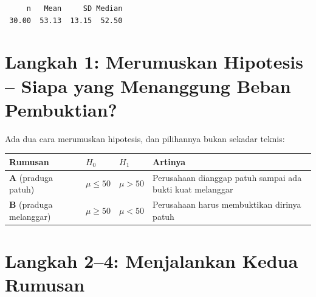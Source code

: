 \documentclass[
  indonesian,
  letterpaper,
]{book}
\newcounter{none} %
\begin{document}
\begin{verbatim}
     n   Mean     SD Median 
 30.00  53.13  13.15  52.50 
\end{verbatim}

\section{Langkah 1: Merumuskan Hipotesis -- Siapa yang Menanggung Beban
Pembuktian?}\label{langkah-1-merumuskan-hipotesis-siapa-yang-menanggung-beban-pembuktian}

Ada dua cara merumuskan hipotesis, dan pilihannya bukan sekadar teknis:

{\def\LTcaptype{none} %
\begin{longtable}[]{@{}
  >{\raggedright\arraybackslash}p{}
  >{\raggedright\arraybackslash}p{}
  >{\raggedright\arraybackslash}p{}
  >{\raggedright\arraybackslash}p{}@{}}
\toprule\noalign{}
\begin{minipage}[b]{\linewidth}\raggedright
Rumusan
\end{minipage} & \begin{minipage}[b]{\linewidth}\raggedright
\(H_0\)
\end{minipage} & \begin{minipage}[b]{\linewidth}\raggedright
\(H_1\)
\end{minipage} & \begin{minipage}[b]{\linewidth}\raggedright
Artinya
\end{minipage} \\
\midrule\noalign{}
\endhead
\bottomrule\noalign{}
\endlastfoot
\textbf{A} (praduga patuh) & \(\mu \le 50\) & \(\mu > 50\) & Perusahaan
dianggap patuh sampai ada bukti kuat melanggar \\
\textbf{B} (praduga melanggar) & \(\mu \ge 50\) & \(\mu < 50\) &
Perusahaan harus membuktikan dirinya patuh \\
\end{longtable}
}

\section{Langkah 2--4: Menjalankan Kedua
Rumusan}\label{langkah-24-menjalankan-kedua-rumusan}
\end{document}
